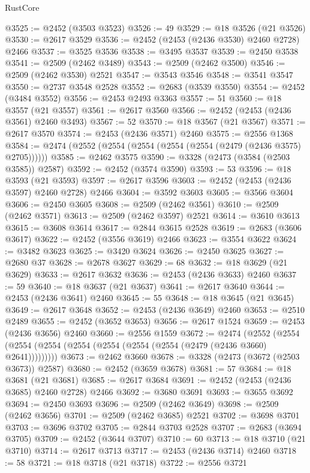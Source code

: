 \begin{lexlean}{RustCore}
\begin{coremodule}
@3525 := @2452 (@3503 @3523)
@3526 := 49
@3529 := @18 @3526 (@21 @3526)
@3530 := @2617 @3529
@3536 := @2452 (@2453 (@2436 @3530) @2460 @2728) @2466
@3537 := @3525 @3536
@3538 := @3495 @3537
@3539 := @2450 @3538
@3541 := @2509 (@2462 @3489)
@3543 := @2509 (@2462 @3500)
@3546 := @2509 (@2462 @3530) @2521
@3547 := @3543 @3546
@3548 := @3541 @3547
@3550 := @2737 @3548 @2528
@3552 := @2683 (@3539 @3550)
@3554 := @2452 (@3484 @3552)
@3556 := @2453 @2493 @3363
@3557 := 51
@3560 := @18 @3557 (@21 @3557)
@3561 := @2617 @3560
@3566 := @2452 (@2453 (@2436 @3561) @2460 @3493)
@3567 := 52
@3570 := @18 @3567 (@21 @3567)
@3571 := @2617 @3570
@3574 := @2453 (@2436 @3571) @2460
@3575 := @2556 @1368
@3584 := @2474 (@2552 (@2554 (@2554 (@2554 (@2554 (@2479 (@2436 @3575) @2705))))))
@3585 := @2462 @3575
@3590 := @3328 (@2473 (@3584 (@2503 @3585)) @2587)
@3592 := @2452 (@3574 @3590)
@3593 := 53
@3596 := @18 @3593 (@21 @3593)
@3597 := @2617 @3596
@3603 := @2452 (@2453 (@2436 @3597) @2460 @2728) @2466
@3604 := @3592 @3603
@3605 := @3566 @3604
@3606 := @2450 @3605
@3608 := @2509 (@2462 @3561)
@3610 := @2509 (@2462 @3571)
@3613 := @2509 (@2462 @3597) @2521
@3614 := @3610 @3613
@3615 := @3608 @3614
@3617 := @2844 @3615 @2528
@3619 := @2683 (@3606 @3617)
@3622 := @2452 (@3556 @3619) @2466
@3623 := @3554 @3622
@3624 := @3482 @3623
@3625 := @3420 @3624
@3626 := @2450 @3625
@3627 := @2680 @37
@3628 := @2678 @3627
@3629 := 68
@3632 := @18 @3629 (@21 @3629)
@3633 := @2617 @3632
@3636 := @2453 (@2436 @3633) @2460
@3637 := 59
@3640 := @18 @3637 (@21 @3637)
@3641 := @2617 @3640
@3644 := @2453 (@2436 @3641) @2460
@3645 := 55
@3648 := @18 @3645 (@21 @3645)
@3649 := @2617 @3648
@3652 := @2453 (@2436 @3649) @2460
@3653 := @2510 @2489
@3655 := @2452 (@3652 @3653)
@3656 := @2617 @1524
@3659 := @2453 (@2436 @3656) @2460
@3660 := @2556 @1559
@3672 := @2474
    (@2552 (@2554 (@2554 (@2554 (@2554 (@2554 (@2554 (@2554 (@2479 (@2436 @3660) @2641)))))))))
@3673 := @2462 @3660
@3678 := @3328 (@2473 (@3672 (@2503 @3673)) @2587)
@3680 := @2452 (@3659 @3678)
@3681 := 57
@3684 := @18 @3681 (@21 @3681)
@3685 := @2617 @3684
@3691 := @2452 (@2453 (@2436 @3685) @2460 @2728) @2466
@3692 := @3680 @3691
@3693 := @3655 @3692
@3694 := @2450 @3693
@3696 := @2509 (@2462 @3649)
@3698 := @2509 (@2462 @3656)
@3701 := @2509 (@2462 @3685) @2521
@3702 := @3698 @3701
@3703 := @3696 @3702
@3705 := @2844 @3703 @2528
@3707 := @2683 (@3694 @3705)
@3709 := @2452 (@3644 @3707)
@3710 := 60
@3713 := @18 @3710 (@21 @3710)
@3714 := @2617 @3713
@3717 := @2453 (@2436 @3714) @2460
@3718 := 58
@3721 := @18 @3718 (@21 @3718)
@3722 := @2556 @3721

\end{coremodule}
\end{lexlean}
